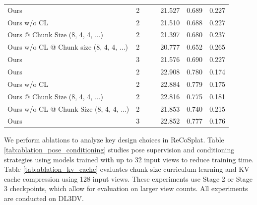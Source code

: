 \documentclass[runningheads]{llncs}
\newcommand{\cmark}{\ding{51}}
\begin{document}
\begin{table}[tp]
\begin{minipage}[t]{0.48\linewidth}
{\begin{tabular}{lccc|ccc}
            Ours                                        & 2 &        & \cmark & 21.527 & 0.689 & 0.227 \\
            Ours w/o CL                                 & 2 &        & \cmark & 21.510 & 0.688 & 0.227 \\
            Ours @ Chunk Size (8, 4, 4, ...)            & 2 &        & \cmark & 21.397 & 0.680 & 0.237 \\
            Ours w/o CL @ Chunk size (8, 4, 4, ...)     & 2 &        & \cmark & 20.777 & 0.652 & 0.265 \\
            
            \midrule

            Ours                                        & 3 &        & \cmark & {21.576} & {0.690} & {0.227} \\
            
            \midrule
            
            Ours                                        & 2 & \cmark & \cmark & 22.908 & 0.780 & 0.174 \\
            Ours w/o CL                                 & 2 & \cmark & \cmark & 22.884 & 0.779 & 0.175 \\
            Ours @ Chunk Size (8, 4, 4, ...)            & 2 & \cmark & \cmark & 22.816 & 0.775 & 0.181 \\
            Ours w/o CL @ Chunk Size (8, 4, 4, ...)     & 2 & \cmark & \cmark & 21.853 & 0.740 & 0.215 \\

            \midrule

            Ours                                        & 3 & \cmark & \cmark & {22.852} & {0.777} & {0.176} \\
            
            \bottomrule
        \end{tabular}
    }
\end{minipage}
\end{table}

We perform ablations to analyze key design choices in ReCoSplat. 
Table \ref{tab:ablation_pose_conditioning} studies pose supervision and conditioning strategies using models trained with up to 32 input views to reduce training time. 
Table \ref{tab:ablation_kv_cache} evaluates chunk-size curriculum learning and KV cache compression using 128 input views. 
These experiments use Stage 2 or Stage 3 checkpoints, which allow for evaluation on larger view counts. 
All experiments are conducted on DL3DV.
\end{document}
